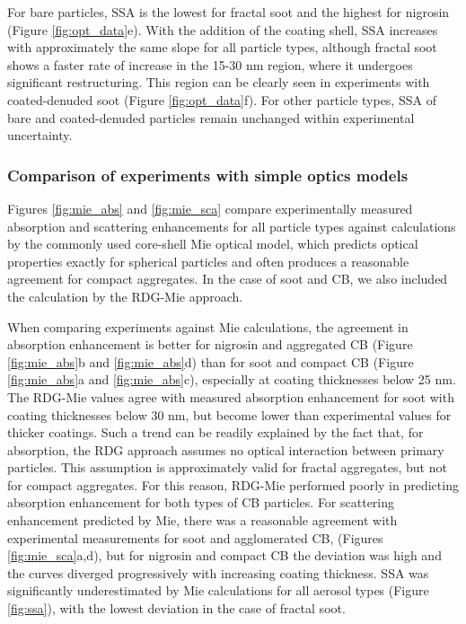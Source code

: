\documentclass[12pt,authoryear]{elsarticle}
\begin{document}
For bare particles, SSA is the lowest for fractal soot and the highest for nigrosin (Figure \ref{fig:opt_data}e). With the addition of the coating shell, SSA increases with approximately the same slope for all particle types, although fractal soot shows a faster rate of increase in the 15-30 nm region, where it undergoes significant restructuring. This region can be clearly seen in experiments with coated-denuded soot (Figure \ref{fig:opt_data}f). For other particle types, SSA of bare and coated-denuded particles remain unchanged within experimental uncertainty.


\subsubsection{Comparison of experiments with simple optics models}

Figures \ref{fig:mie_abs} and \ref{fig:mie_sca} compare experimentally measured absorption and scattering enhancements for all particle types against calculations by the commonly used core-shell Mie optical model, which predicts optical properties exactly for spherical particles and often produces a reasonable agreement for compact aggregates. In the case of soot and CB, we also included the calculation by the RDG-Mie approach.


When comparing experiments against Mie calculations, the agreement in absorption enhancement is better for nigrosin and aggregated CB (Figure \ref{fig:mie_abs}b and \ref{fig:mie_abs}d) than for soot and compact CB (Figure \ref{fig:mie_abs}a and \ref{fig:mie_abs}c), especially at coating thicknesses below 25 nm. The RDG-Mie values agree with measured absorption enhancement for soot with coating thicknesses below 30 nm, but become lower than experimental values for thicker coatings. Such a trend can be readily explained by the fact that, for absorption, the RDG approach assumes no optical interaction between primary particles. This assumption is approximately valid for fractal aggregates, but not for compact aggregates. For this reason, RDG-Mie performed poorly in predicting absorption enhancement for both types of CB particles. For scattering enhancement predicted by Mie, there was a reasonable agreement with experimental measurements for soot and agglomerated CB, (Figures \ref{fig:mie_sca}a,d), but for nigrosin and compact CB the deviation was high and the curves diverged progressively with increasing coating thickness. SSA was significantly underestimated by Mie calculations for all aerosol types (Figure \ref{fig:ssa}), with the lowest deviation in the case of fractal soot.
\end{document}
